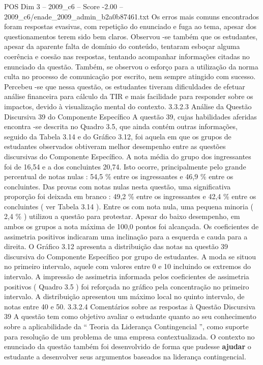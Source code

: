 \begin{textsample}{POS Dim 3 – 2009\_c6 – Score -2.00 – 2009\_c6/enade\_2009\_admin\_b2a0b87461.txt}
Os erros mais comuns encontrados foram respostas evasivas, com repetição do enunciado e fuga ao tema, apesar dos questionamentos terem sido bem claros.
Observou -se também que os estudantes, apesar da aparente falta de domínio do conteúdo, tentaram esboçar alguma coerência e coesão nas respostas, tentando acompanhar informações citadas no enunciado da questão.
Também, se observou o esforço para a utilização da norma culta no processo de comunicação por escrito, nem sempre atingido com sucesso.
Percebeu -se que nessa questão, os estudantes tiveram dificuldades de efetuar análise financeira para cálculo da TIR e mais facilidade para responder sobre os impactos, devido à visualização mental do contexto. 3.3.2.3 Análise da Questão Discursiva 39 do Componente Específico A questão 39, cujas habilidades aferidas encontra -se descrita no Quadro 3.5, que ainda contém outras informações, seguido da Tabela 3.14 e do Gráfico 3.12, foi aquela em que os grupos de estudantes observados obtiveram melhor desempenho entre as questões discursivas do Componente Específico.
A nota média do grupo dos ingressantes foi de 16,54 e a dos concluintes 20,74.
Isto ocorre, principalmente pelo grande percentual de notas nulas : 54,5 \% entre os ingressantes e 46,9 \% entre os concluintes.
Das provas com notas nulas nesta questão, uma significativa proporção foi deixada em branco : 49,2 \% entre os ingressantes e 42,4 \% entre os concluintes ( ver Tabela 3.14 ).
Entre os com nota nula, uma pequena minoria ( 2,4 \% ) utilizou a questão para protestar.
Apesar do baixo desempenho, em ambos os grupos a nota máxima de 100,0 pontos foi alcançada.
Os coeficientes de assimetria positivos indicaram uma inclinação para a esquerda e cauda para a direita.
O Gráfico 3.12 apresenta a distribuição das notas na questão 39 discursiva do Componente Específico por grupo de estudantes.
A moda se situou no primeiro intervalo, aquele com valores entre 0 e 10 incluindo os extremos do intervalo.
A impressão de assimetria informada pelos coeficientes de assimetria positivos ( Quadro 3.5 ) foi reforçada no gráfico pela concentração no primeiro intervalo.
A distribuição apresentou um máximo local no quinto intervalo, de notas entre 40 e 50. 3.3.2.4 Comentários sobre as respostas à Questão Discursiva 39 A questão tem como objetivo avaliar o estudante quanto ao seu conhecimento sobre a aplicabilidade da “ Teoria da Liderança Contingencial ”, como suporte para resolução de um problema de uma empresa contextualizada.
O contexto no enunciado da questão também foi desenvolvido de forma que pudesse \textbf{ajudar} o estudante a desenvolver seus argumentos baseados na liderança contingencial.

\end{textsample}
